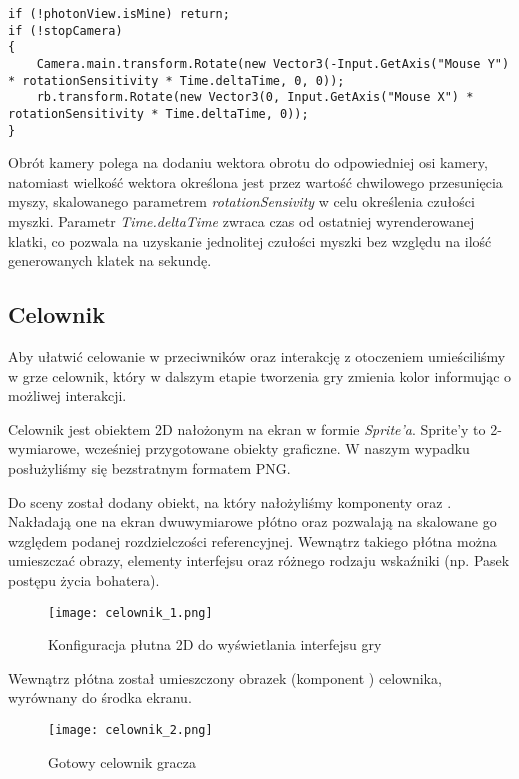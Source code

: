 \begin{lstlisting}[caption={Obrót kamery za pomocą myszy}]
if (!photonView.isMine) return;
if (!stopCamera)
{
    Camera.main.transform.Rotate(new Vector3(-Input.GetAxis("Mouse Y") * rotationSensitivity * Time.deltaTime, 0, 0));
    rb.transform.Rotate(new Vector3(0, Input.GetAxis("Mouse X") * rotationSensitivity * Time.deltaTime, 0));
}
\end{lstlisting}

Obrót kamery polega na dodaniu wektora obrotu do odpowiedniej osi kamery, natomiast wielkość wektora określona jest przez wartość chwilowego przesunięcia myszy, skalowanego parametrem \textit{rotationSensivity} w celu określenia czułości myszki. Parametr \textit{Time.deltaTime} zwraca czas od ostatniej wyrenderowanej klatki, co pozwala na uzyskanie jednolitej czułości myszki bez względu na ilość generowanych klatek na sekundę.

\subsection{Celownik}

Aby ułatwić celowanie w przeciwników oraz interakcję z otoczeniem umieściliśmy w grze celownik, który w dalszym etapie tworzenia gry zmienia kolor informując o możliwej interakcji.

Celownik jest obiektem 2D nałożonym na ekran w formie \textit{Sprite'a}. Sprite'y to 2-wymiarowe, wcześniej przygotowane obiekty graficzne. W naszym wypadku posłużyliśmy się bezstratnym formatem PNG.

Do sceny został dodany obiekt, na który nałożyliśmy komponenty  oraz . Nakładają one na ekran dwuwymiarowe płótno oraz pozwalają na skalowane go względem podanej rozdzielczości referencyjnej. Wewnątrz takiego płótna można umieszczać obrazy, elementy interfejsu oraz różnego rodzaju wskaźniki (np. Pasek postępu życia bohatera).

\begin{figure}[H]
\center
\texttt{[image: celownik\_1.png]}
\caption{Konfiguracja płutna 2D do wyświetlania interfejsu gry}
\end{figure}

Wewnątrz płótna został umieszczony obrazek (komponent ) celownika, wyrównany do środka ekranu.

\begin{figure}[H]
\center
\texttt{[image: celownik\_2.png]}
\caption{Gotowy celownik gracza}
\end{figure}